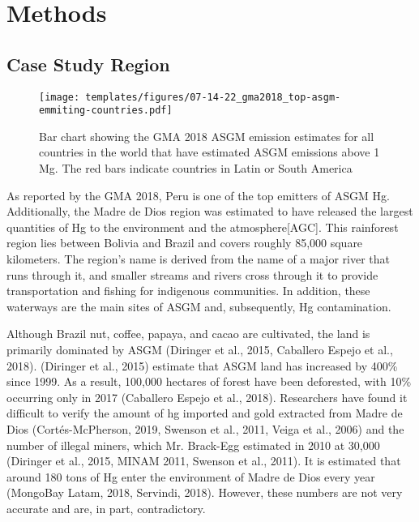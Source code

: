 \section{Methods}

\subsection{Case Study Region}
\begin{figure}[H]
  \texttt{[image: templates/figures/07-14-22\_gma2018\_top-asgm-emmiting-countries.pdf]}
  \centering
  \caption{Bar chart showing the GMA 2018 ASGM \hg emission estimates for all countries in the world that have estimated ASGM \hg emissions above 1 Mg. The red bars indicate countries in Latin or South America }
  \label{fig:Latam_Hg_em}
\end{figure}
\FloatBarrier
\begin{flushleft}
As reported by the GMA 2018, Peru is one of the top emitters of ASGM Hg. Additionally, the Madre de Dios region was estimated to have released the largest quantities of Hg to the environment and the atmosphere[AGC]. This rainforest region lies between Bolivia and Brazil and covers roughly 85,000 square kilometers. The region's name is derived from the name of a major river that runs through it, and smaller streams and rivers cross through it to provide transportation and fishing for indigenous communities. In addition, these waterways are the main sites of ASGM and, subsequently, Hg contamination. 
\end{flushleft}

\begin{flushleft}
Although Brazil nut, coffee, papaya, and cacao are cultivated, the land is primarily dominated by ASGM (Diringer et al., 2015, Caballero Espejo et al., 2018). (Diringer et al., 2015) estimate that ASGM land has increased by 400\% since 1999. As a result, 100,000 hectares of forest have been deforested, with 10\% occurring only in 2017 (Caballero Espejo et al., 2018). Researchers have found it difficult to verify the amount of hg imported and gold extracted from Madre de Dios (Cortés-McPherson, 2019, Swenson et al., 2011, Veiga et al., 2006) and the number of illegal miners, which Mr. Brack-Egg estimated in 2010 at 30,000 (Diringer et al., 2015, MINAM 2011, Swenson et al., 2011). It is estimated that around 180 tons of Hg enter the environment of Madre de Dios every year (MongoBay Latam, 2018, Servindi, 2018). However, these numbers are not very accurate and are, in part, contradictory. 
\end{flushleft}


